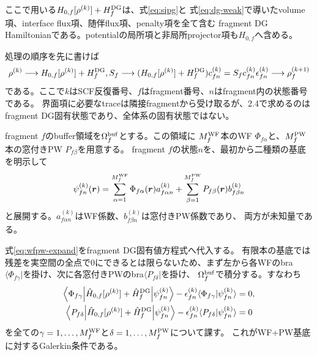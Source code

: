 \documentclass[11pt,a4paper]{article}
\begin{document}
ここで用いる$H_{0,f}[\rho^{(k)}]+H_f^{\rm DG}$は、式\eqref{eq:sipg}と
式\eqref{eq:dg-weak}で導いたvolume項、interface flux項、随伴flux項、penalty項を全て含む
fragment DG Hamiltonianである。potentialの局所項と非局所projector項も$H_{0,f}$へ含める。

処理の順序を先に書けば
\begin{equation}
 \rho^{(k)}
 \longrightarrow H_{0,f}[\rho^{(k)}]+H_f^{\rm DG},S_f
 \longrightarrow (H_{0,f}[\rho^{(k)}]+H_f^{\rm DG})c_{fn}^{(k)}
                 =S_fc_{fn}^{(k)}\epsilon_{fn}^{(k)}
 \longrightarrow \rho_f^{(k+1)}
 \label{eq:fragment-scf-purpose}
\end{equation}
である。ここで$k$はSCF反復番号、$f$はfragment番号、$n$はfragment内の状態番号である。
界面項に必要なtraceは隣接fragmentから受け取るが、2.4で求めるのはfragment DG固有状態であり、全体系の固有状態ではない。

fragment $f$のbuffer領域を$\Omega_f^{\rm buf}$とする。この領域に
$M_f^{\rm WF}$本のWF $\Phi_{f\alpha}$と、$M_f^{\rm PW}$本の窓付きPW $P_{f\beta}$を用意する。
fragment $f$の状態$n$を、最初から二種類の基底を明示して
\begin{equation}
 \psi_{fn}^{(k)}(\boldsymbol r)
 =
 \sum_{\alpha=1}^{M_f^{\rm WF}}\Phi_{f\alpha}(\boldsymbol r)a_{f\alpha n}^{(k)}
 +\sum_{\beta=1}^{M_f^{\rm PW}}P_{f\beta}(\boldsymbol r)b_{f\beta n}^{(k)}
 \label{eq:wfpw-expand}
\end{equation}
と展開する。$a_{f\alpha n}^{(k)}$はWF係数、$b_{f\beta n}^{(k)}$は窓付きPW係数であり、
両方が未知量である。

式\eqref{eq:wfpw-expand}をfragment DG固有値方程式へ代入する。
有限本の基底では残差を実空間の全点で0にできるとは限らないため、まず左から各WFのbra
$\langle\Phi_{f\gamma}|$を掛け、次に各窓付きPWのbra$\langle P_{f\delta}|$を掛け、
$\Omega_f^{\rm buf}$で積分する。すなわち
\begin{align}
 \left\langle\Phi_{f\gamma}\middle|\hat H_{0,f}[\rho^{(k)}]+\hat H_f^{\rm DG}
 \middle|\psi_{fn}^{(k)}\right\rangle
 -\epsilon_{fn}^{(k)}\langle\Phi_{f\gamma}|\psi_{fn}^{(k)}\rangle&=0,\\
 \left\langle P_{f\delta}\middle|\hat H_{0,f}[\rho^{(k)}]+\hat H_f^{\rm DG}
 \middle|\psi_{fn}^{(k)}\right\rangle
 -\epsilon_{fn}^{(k)}\langle P_{f\delta}|\psi_{fn}^{(k)}\rangle&=0
 \label{eq:wfpw-galerkin-pairs}
\end{align}
を全ての$\gamma=1,\ldots,M_f^{\rm WF}$と$\delta=1,\ldots,M_f^{\rm PW}$について課す。
これがWF+PW基底に対するGalerkin条件である。
\end{document}
